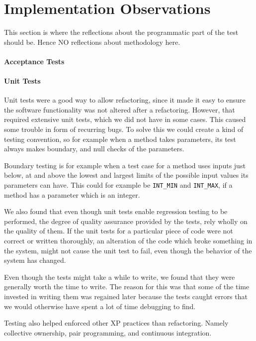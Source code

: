 \section{Implementation Observations}
This section is where the reflections about the programmatic part of the test should be. Hence NO reflections about methodology here.

\paragraph{Acceptance Tests}

\paragraph{Unit Tests}
Unit tests were a good way to allow refactoring, since it made it easy to ensure the software functionality was not altered after a refactoring. However, that required extensive unit tests, which we did not have in some cases. This caused some trouble in form of recurring bugs. To solve this we could create a kind of testing convention, so for example when a method takes parameters, its test always makes boundary, and null checks of the parameters.%

Boundary testing is for example when a test case for a method uses inputs just below, at and above the lowest and largest limits of the possible input values its parameters can have. This could for example be \texttt{INT\_MIN} and \texttt{INT\_MAX}, if a method has a parameter which is an integer.

We also found that even though unit tests enable regression testing to be performed, the degree of quality assurance provided by the tests, rely wholly on the quality of them. If the unit tests for a particular piece of code were not correct or written thoroughly, an alteration of the code which broke something in the system, might not cause the unit test to fail, even though the behavior of the system has changed.

Even though the tests might take a while to write, we found that they were generally worth the time to write. The reason for this was that some of the time invested in writing them was regained later because the tests caught errors that we would otherwise have spent a lot of time debugging to find.


Testing also helped enforced other XP practices than refactoring. Namely collective ownership, pair programming, and continuous integration. 


